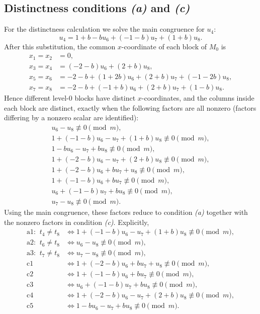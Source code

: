 \documentclass[11pt]{article}
\newcommand{\mymod}{\pmod m}
\begin{document}
\subsection{Distinctness conditions \emph{(a)} and \emph{(c)}}
For the distinctness calculation we solve the main congruence for $u_{4}$:
\[
u_{4}=1 + b - bu_{6} + \left(-1 - b\right)u_{7} + \left(1 + b\right)u_{8}.
\]
After this substitution, the common $x$-coordinate of each block of $M_0$ is
\[
\begin{aligned}
x_{1}=x_{2}&=0,\\
x_{3}=x_{4}&=\left(-2 - b\right)u_{6} + \left(2 + b\right)u_{8},\\
x_{5}=x_{6}&=-2 - b + \left(1 + 2b\right)u_{6} + \left(2 + b\right)u_{7} + \left(-1 - 2b\right)u_{8},\\
x_{7}=x_{8}&=-2 - b + \left(-1 + b\right)u_{6} + \left(2 + b\right)u_{7} + \left(1 - b\right)u_{8}.
\end{aligned}
\]
Hence different level-$0$ blocks have distinct $x$-coordinates, and the columns inside each block are distinct, exactly when the following factors are all nonzero (factors differing by a nonzero scalar are identified):
\[
\begin{gathered}
u_{6} - u_{8}\not\equiv 0\mymod,\\
1 + \left(-1 - b\right)u_{6} - u_{7} + \left(1 + b\right)u_{8}\not\equiv 0\mymod,\\
1 - bu_{6} - u_{7} + bu_{8}\not\equiv 0\mymod,\\
1 + \left(-2 - b\right)u_{6} - u_{7} + \left(2 + b\right)u_{8}\not\equiv 0\mymod,\\
1 + \left(-2 - b\right)u_{6} + bu_{7} + u_{8}\not\equiv 0\mymod,\\
1 + \left(-1 - b\right)u_{6} + bu_{7}\not\equiv 0\mymod,\\
u_{6} + \left(-1 - b\right)u_{7} + bu_{8}\not\equiv 0\mymod,\\
u_{7} - u_{8}\not\equiv 0\mymod.
\end{gathered}
\]
Using the main congruence, these factors reduce to condition \emph{(a)} together with the nonzero factors in condition \emph{(c)}.  Explicitly,
\[
\begin{aligned}
\text{a1: }\ t_4 \neq t_8&\Longleftrightarrow 1 + \left(-1 - b\right)u_{6} - u_{7} + \left(1 + b\right)u_{8}\not\equiv0\mymod,\\
\text{a2: }\ t_6 \neq t_8&\Longleftrightarrow u_{6} - u_{8}\not\equiv0\mymod,\\
\text{a3: }\ t_7 \neq t_8&\Longleftrightarrow u_{7} - u_{8}\not\equiv0\mymod,\\
\text{c1}&\Longleftrightarrow 1 + \left(-2 - b\right)u_{6} + bu_{7} + u_{8}\not\equiv0\mymod,\\
\text{c2}&\Longleftrightarrow 1 + \left(-1 - b\right)u_{6} + bu_{7}\not\equiv0\mymod,\\
\text{c3}&\Longleftrightarrow u_{6} + \left(-1 - b\right)u_{7} + bu_{8}\not\equiv0\mymod,\\
\text{c4}&\Longleftrightarrow 1 + \left(-2 - b\right)u_{6} - u_{7} + \left(2 + b\right)u_{8}\not\equiv0\mymod,\\
\text{c5}&\Longleftrightarrow 1 - bu_{6} - u_{7} + bu_{8}\not\equiv0\mymod.
\end{aligned}
\]
\end{document}
